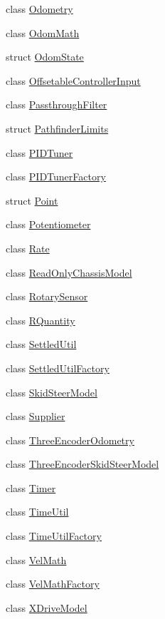 \begin{DoxyCompactItemize}
class \mbox{\hyperlink{classokapi_1_1Odometry}{Odometry}}
\item 
class \mbox{\hyperlink{classokapi_1_1OdomMath}{Odom\+Math}}
\item 
struct \mbox{\hyperlink{structokapi_1_1OdomState}{Odom\+State}}
\item 
class \mbox{\hyperlink{classokapi_1_1OffsetableControllerInput}{Offsetable\+Controller\+Input}}
\item 
class \mbox{\hyperlink{classokapi_1_1PassthroughFilter}{Passthrough\+Filter}}
\item 
struct \mbox{\hyperlink{structokapi_1_1PathfinderLimits}{Pathfinder\+Limits}}
\item 
class \mbox{\hyperlink{classokapi_1_1PIDTuner}{P\+I\+D\+Tuner}}
\item 
class \mbox{\hyperlink{classokapi_1_1PIDTunerFactory}{P\+I\+D\+Tuner\+Factory}}
\item 
struct \mbox{\hyperlink{structokapi_1_1Point}{Point}}
\item 
class \mbox{\hyperlink{classokapi_1_1Potentiometer}{Potentiometer}}
\item 
class \mbox{\hyperlink{classokapi_1_1Rate}{Rate}}
\item 
class \mbox{\hyperlink{classokapi_1_1ReadOnlyChassisModel}{Read\+Only\+Chassis\+Model}}
\item 
class \mbox{\hyperlink{classokapi_1_1RotarySensor}{Rotary\+Sensor}}
\item 
class \mbox{\hyperlink{classokapi_1_1RQuantity}{R\+Quantity}}
\item 
class \mbox{\hyperlink{classokapi_1_1SettledUtil}{Settled\+Util}}
\item 
class \mbox{\hyperlink{classokapi_1_1SettledUtilFactory}{Settled\+Util\+Factory}}
\item 
class \mbox{\hyperlink{classokapi_1_1SkidSteerModel}{Skid\+Steer\+Model}}
\item 
class \mbox{\hyperlink{classokapi_1_1Supplier}{Supplier}}
\item 
class \mbox{\hyperlink{classokapi_1_1ThreeEncoderOdometry}{Three\+Encoder\+Odometry}}
\item 
class \mbox{\hyperlink{classokapi_1_1ThreeEncoderSkidSteerModel}{Three\+Encoder\+Skid\+Steer\+Model}}
\item 
class \mbox{\hyperlink{classokapi_1_1Timer}{Timer}}
\item 
class \mbox{\hyperlink{classokapi_1_1TimeUtil}{Time\+Util}}
\item 
class \mbox{\hyperlink{classokapi_1_1TimeUtilFactory}{Time\+Util\+Factory}}
\item 
class \mbox{\hyperlink{classokapi_1_1VelMath}{Vel\+Math}}
\item 
class \mbox{\hyperlink{classokapi_1_1VelMathFactory}{Vel\+Math\+Factory}}
\item 
class \mbox{\hyperlink{classokapi_1_1XDriveModel}{X\+Drive\+Model}}
\end{DoxyCompactItemize}
